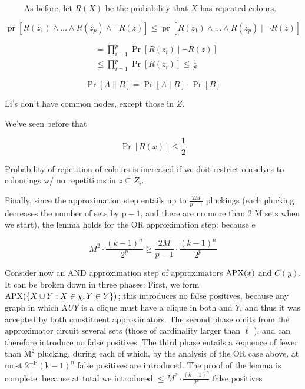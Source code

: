 $\qquad$ As before, let $R(X)$ be the probability that $X$ has repeated colours.

$$
\operatorname{pr}\left[R\left(z_1\right) \wedge \ldots \wedge R\left(z_p\right) \wedge \neg R(z)\right] \leq \operatorname{pr}\left[R\left(z_1\right) \wedge \ldots \wedge R\left(z_p\right) \mid \neg R(z)\right]$$

$$
\begin{aligned}
& =\prod_{i=1}^p \operatorname{Pr}\left[R\left(z_i\right) \mid \neg R(z)\right] \\
& \leq \prod_{i=1}^p \operatorname{Pr}\left[R\left(z_i\right)\right]
\leq \frac{1}{2^p}
\end{aligned}
$$

$$
\operatorname{Pr}[A \| B]=\operatorname{Pr}[A \mid B] \cdot \operatorname{Pr}[B]
$$


Li's don't have common nodes, except those in $Z$.

We've seen before that

$$
\operatorname{Pr}[R(x)] \leq \frac{1}{2}
$$

Probability of repetition of colours is increased if we doit restrict ourselves to colourings w/ no repetitions in $z \subseteq Z_i$.


Finally, since the approximation step entails up to $\frac{2 M}{p-1}$ pluckings (each plucking decreases the number of sets by $\mathrm{p}-1$, and there are no more than 2 M sets when we start), the lemma holds for the OR approximation step: because e

$$
M^2 \cdot \frac{(k-1)^n}{2^p} \geq \frac{2 M}{p-1} \cdot \frac{(k-1)^n}{2^p}
$$



Consider now an AND approximation step of approximators $\mathrm{APX}(x)$ and $C(y)$. It can be broken down in three phases: First, we form $\mathrm{APX}(\{X \cup Y: X \in \chi, Y \in Y\})$; this introduces no false positives, because any graph in which $X U Y$ is a clique must have a clique in both and $Y$, and thus it was accepted by both constituent approximators. The second phase omits from the approximator circuit several sets (those of cardinality larger than $\ell$ ), and can therefore introduce no false positives. The third phase entails a sequence of fewer than $\mathrm{M}^2$ plucking, during each of which, by the analysis of the OR case above, at most $2^{-\mathrm{P}}(\mathrm{k}-1)^{\mathrm{n}}$ false positives are introduced. The proof of the lemma is complete: because at total we introduced $\leq M^2 \cdot \frac{(k-1)^n}{2^p}$ false positives



